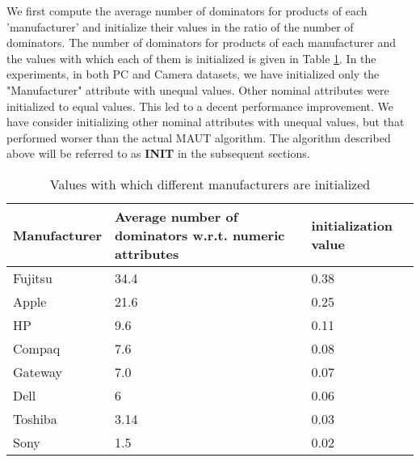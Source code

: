 We first compute the average number of dominators for products of each 'manufacturer' and initialize their values in the ratio of the number of dominators.
The number of dominators for products of each manufacturer and the values with which each of them is initialized is given in Table \ref{tab:marketEq}.
In the experiments, in both PC and Camera datasets, we have initialized only the "Manufacturer" attribute with unequal values. Other nominal attributes were initialized to equal values. This led to a decent performance improvement.
We have consider initializing other nominal attributes with unequal values, but that performed worser than the actual MAUT algorithm.
The algorithm described above will be referred to as \textbf{INIT} in the subsequent sections.


\begin{table}
\renewcommand{\arraystretch}{1.3}
 \centering
 \begin{tabular}{|l |p{6cm}| l|}
  \hline 
   Manufacturer & Average number of dominators w.r.t. numeric attributes & initialization value \\
  \hline
  Fujitsu & 34.4 & 0.38  \\
  Apple & 21.6 &   0.25\\
  HP & 9.6 &   0.11\\
  Compaq & 7.6&   0.08\\
  Gateway & 7.0 &   0.07\\
  Dell & 6 &   0.06\\
  Toshiba & 3.14 &   0.03\\
  Sony & 1.5 &   0.02\\
  \hline
 \end{tabular}
 \caption{Values with which different manufacturers are initialized}
 \label{tab:marketEq}
\end{table}
